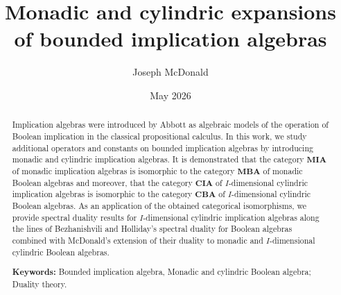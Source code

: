 \documentclass[reqno]{amsart}
\theoremstyle{plain}
\theoremstyle{definition}
\begin{document}
\title[Monadic and cylindric expansions of bounded implication algebras]{Monadic and cylindric expansions of bounded implication algebras}
\author{Joseph McDonald }
\address{Department of Theoretical Computer Science\\Institute of Computer Science, Czech Academy of Sciences}

\date{May 2026}
\maketitle




\begin{abstract}
Implication algebras were introduced by Abbott as algebraic models of the operation of Boolean implication in the classical propositional calculus. In this work, we study additional operators and constants on bounded implication algebras by introducing monadic and cylindric implication algebras. It is demonstrated that the category $\mathbf{MIA}$ of monadic implication algebras is isomorphic to the category $\mathbf{MBA}$ of monadic Boolean algebras and moreover, that the category $\mathbf{CIA}$ of $I$-dimensional cylindric implication algebras is isomorphic to the category $\mathbf{CBA}$ of $I$-dimensional cylindric Boolean algebras. As an application of the obtained categorical isomorphisms, we provide spectral duality results for $I$-dimensional cylindric implication algebras along the lines of Bezhanishvili and Holliday's spectral duality for Boolean algebras combined with McDonald's extension of their duality to monadic and $I$-dimensional cylindric Boolean algebras. 
\par
\vspace{.2cm}
\noindent \textbf{Keywords:} Bounded implication algebra, Monadic and cylindric Boolean algebra; Duality theory. 
\end{abstract}









\maketitle
\end{document}
